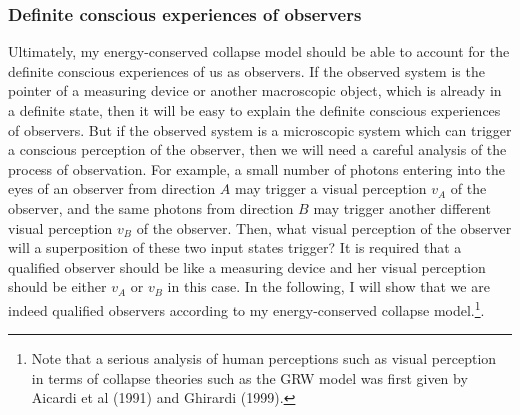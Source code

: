 
\subsubsection{Definite conscious experiences of observers}

Ultimately, my energy-conserved collapse model should be able to account for the definite conscious experiences of us as observers. 
If the observed system is the pointer of a measuring device or another macroscopic object, which is already in a definite state, then it will be easy to explain the definite conscious experiences of observers. 
But if the observed system is a microscopic system which can trigger a conscious perception of the observer, then we will need a careful analysis of the process of observation. 
For example, a small number of photons entering into the eyes of an observer from direction $A$ may trigger a visual perception $v_A$ of the observer, and the same photons from direction $B$ may trigger another different visual perception $v_B$ of the observer. Then, what visual perception of the observer will a superposition of these two input states trigger? It is required that a qualified observer should be like a measuring device and her visual perception should be either  $v_A$ or $v_B$ in this case. In the following, I will show that we are indeed qualified observers according to my energy-conserved collapse model.\footnote{Note that a serious analysis of human perceptions such as visual perception in terms of collapse theories such as the GRW model was first given by Aicardi et al (1991) and Ghirardi (1999).}.


